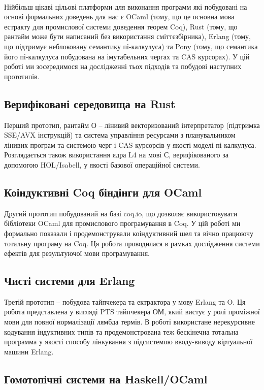 \paragraph{}
Нійбільш цікаві цільові платформи для виконання программ
які побудовані на основі формальних доведень для нас є OCaml (тому,
що це основна мова естракту для промислової системи доведення теорем Coq),
Rust (тому, що рантайм може бути написаний без використання сміттєзбірника),
Erlang (тому, що підтримує неблоковану семантику пі-калкулуса)
та Pony (тому, що семантика його пі-калкулуса побудована на
імутабельних чергах та CAS курсорах).
У цій роботі ми зосередимося на дослідженні тьох підходів
та побудові наступних прототипів.

\subsection{Верифіковані середовища на Rust}
Перший прототип, рантайм О -- лінивий
векторизований інтерпретатор (підтримка SSE/AVX інструкцій) та система
управління ресурсами з планувальником лінивих програм
та системою черг і CAS курсорсів у якості моделі пі-калкулуса. Розглядається також
використання ядра L4 на мові С, верифікованого за допомогою HOL/Isabell,
у якості базової операційної системи.

\subsection{Коіндуктивні Coq біндінги для OCaml}
Другий прототип побудований на базі coq.io, що дозволяє
використовувати бібліотеки OCaml для промислового програмування в Coq.
У цій роботі ми формально показали і продемонстрували коіндуктивний шел
та вічно працюючу тотальну програму на Coq. Ця робота проводилася
в рамках дослідження системи ефектів для результуючої мови програмування.

\subsection{Чисті системи для Erlang}
Третій прототип -- побудова тайпчекера та ектрактора у мову Erlang та O.
Ця робота представлена у вигляді PTS тайпчекера ОМ, який вистує у ролі
проміжної мови для повної нормалізації лямбда термів. В роботі використане
нерекурсивне кодування індуктивних типів та продемонстрована теж бескінечна
тотальна программа у якості способу лінкування з підсистемою вводу-виводу
віртуальної машини Erlang.

\subsection{Гомотопічні системи на Haskell/OCaml}

